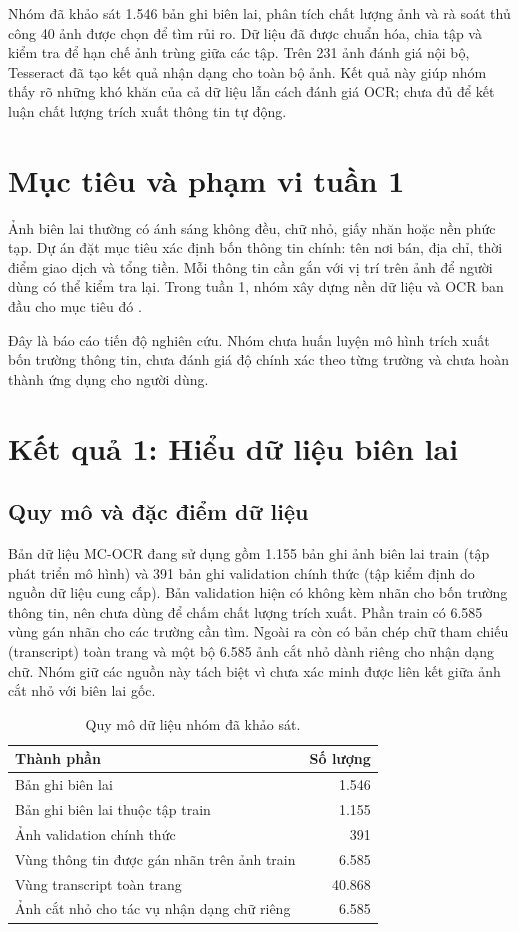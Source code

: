 \documentclass[11pt,a4paper]{article}
\begin{document}
Nhóm đã khảo sát 1.546 bản ghi biên lai, phân tích chất lượng ảnh và rà soát thủ công 40 ảnh được chọn để tìm rủi ro. Dữ liệu đã được chuẩn hóa, chia tập và kiểm tra để hạn chế ảnh trùng giữa các tập. Trên 231 ảnh đánh giá nội bộ, Tesseract đã tạo kết quả nhận dạng cho toàn bộ ảnh. Kết quả này giúp nhóm thấy rõ những khó khăn của cả dữ liệu lẫn cách đánh giá OCR; chưa đủ để kết luận chất lượng trích xuất thông tin tự động.

\section{Mục tiêu và phạm vi tuần 1}
Ảnh biên lai thường có ánh sáng không đều, chữ nhỏ, giấy nhăn hoặc nền phức tạp. Dự án đặt mục tiêu xác định bốn thông tin chính: tên nơi bán, địa chỉ, thời điểm giao dịch và tổng tiền. Mỗi thông tin cần gắn với vị trí trên ảnh để người dùng có thể kiểm tra lại. Trong tuần 1, nhóm xây dựng nền dữ liệu và OCR ban đầu cho mục tiêu đó \cite{mcocr,repo}.

Đây là báo cáo tiến độ nghiên cứu. Nhóm chưa huấn luyện mô hình trích xuất bốn trường thông tin, chưa đánh giá độ chính xác theo từng trường và chưa hoàn thành ứng dụng cho người dùng.

\section{Kết quả 1: Hiểu dữ liệu biên lai}
\subsection{Quy mô và đặc điểm dữ liệu}
Bản dữ liệu MC-OCR đang sử dụng gồm 1.155 bản ghi ảnh biên lai train (tập phát triển mô hình) và 391 bản ghi validation chính thức (tập kiểm định do nguồn dữ liệu cung cấp). Bản validation hiện có không kèm nhãn cho bốn trường thông tin, nên chưa dùng để chấm chất lượng trích xuất. Phần train có 6.585 vùng gán nhãn cho các trường cần tìm. Ngoài ra còn có bản chép chữ tham chiếu (transcript) toàn trang và một bộ 6.585 ảnh cắt nhỏ dành riêng cho nhận dạng chữ. Nhóm giữ các nguồn này tách biệt vì chưa xác minh được liên kết giữa ảnh cắt nhỏ với biên lai gốc.

\begin{table}[H]
\caption{Quy mô dữ liệu nhóm đã khảo sát.}\label{tab:inventory}
\begin{tabularx}{\linewidth}{@{}Yr@{}}
\toprule
\textbf{Thành phần} & \textbf{Số lượng} \\\midrule
Bản ghi biên lai & 1.546 \\
Bản ghi biên lai thuộc tập train & 1.155 \\
Ảnh validation chính thức & 391 \\
Vùng thông tin được gán nhãn trên ảnh train & 6.585 \\
Vùng transcript toàn trang & 40.868 \\
Ảnh cắt nhỏ cho tác vụ nhận dạng chữ riêng & 6.585 \\
\bottomrule
\end{tabularx}
\end{table}
\end{document}

